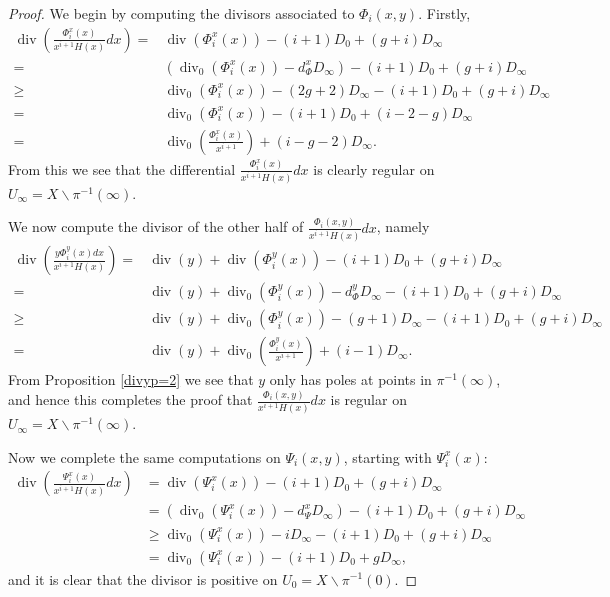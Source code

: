 \documentclass[11pt]{article} %
\theoremstyle{plain}
\theoremstyle{remark}
\DeclareMathOperator{\di}{div}
\begin{document}
\begin{proof}
We begin by computing the divisors associated to $\Phi_i(x,y)$.
Firstly,
\begin{align*}
\di \left( \frac{\Phi_i^x(x) }{x^{i+1} H(x)}dx \right)  = &  \di(\Phi_i^x(x)) -(i+1)D_0 + (g+i)D_\infty\\
 = & \left( \di_0(\Phi_i^x(x)) -d_\Phi^xD_\infty\right) -(i+1)D_0 + (g+i)D_\infty\\
 \geq & \di_0(\Phi_i^x(x)) - (2g+2)D_\infty - (i+1)D_0 + (g+i)D_\infty \\
 = &  \di_0(\Phi_i^x(x)) - (i+1)D_0 + (i-2-g)D_\infty \\
 =  & \di_0 \left( \frac{\Phi_i^x(x)}{x^{i+1}} \right) + (i-g-2)D_\infty.
\end{align*}
From this we see that the differential $\frac{\Phi_i^x(x)}{x^{i+1}H(x)}dx$ is clearly regular on $U_\infty = X \backslash \pi^{-1}(\infty)$.

We now compute the divisor of the other half of $\frac{\Phi_i(x,y)}{x^{i+1}H(x)}dx$, namely
\begin{align*}
\di\left(\frac{y\Phi_i^y(x) dx}{x^{i+1}H(x)} \right)  = & \di(y) + \di(\Phi_i^y(x)) -(i+1)D_0 + (g+i)D_\infty\\
 = & \di(y) + \di_0(\Phi_i^y(x)) - d_\Phi^yD_\infty -(i+1)D_0 + (g+i)D_\infty \\
 \geq & \di(y) + \di_0(\Phi_i^y(x)) - (g+1)D_\infty - (i+1)D_0 + (g+i)D_\infty \\
 = & \di(y) + \di_0\left(\frac{\Phi_i^y(x)}{x^{i+1}} \right) + (i-1)D_\infty.
\end{align*}
From Proposition \ref{divyp=2} we see that $y$ only has poles at points in $\pi^{-1}(\infty)$, and hence this completes the proof that $\frac{\Phi_i(x,y) }{x^{i+1}H(x)}dx$ is regular on $U_\infty = X \backslash \pi^{-1}(\infty)$.

Now we complete the same computations on $\Psi_i(x,y)$, starting with $\Psi_i^x(x)$:
\begin{align*}
\di\left( \frac{\Psi_i^x(x) }{x^{i+1}H(x)}dx \right)  & =   \di(\Psi_i^x(x))  - (i+1)D_0 + (g+i)D_\infty \\
& = (\di_0(\Psi_i^x(x)) -d_\Psi^xD_\infty) - (i+1)D_0 + (g+i)D_\infty \\
 & \geq   \di_0(\Psi_i^x(x) ) - iD_\infty - (i+1)D_0 + (g+i)D_\infty \\
 & =   \di_0(\Psi_i^x(x)) - (i+1)D_0 + gD_\infty,
\end{align*}
and it is clear that the divisor is positive on $U_0 = X \backslash \pi^{-1}(0)$.


\end{proof}
\end{document}

